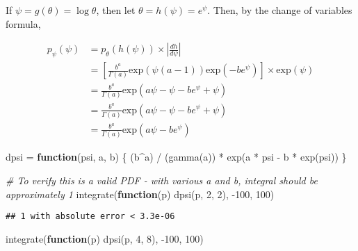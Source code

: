 \documentclass[
]{article}
\newenvironment{Shaded}{\begin{snugshade}}{\end{snugshade}}
\newcommand{\CommentTok}[1]{\textcolor[rgb]{0.56,0.35,0.01}{\textit{#1}}}
\newcommand{\ControlFlowTok}[1]{\textcolor[rgb]{0.13,0.29,0.53}{\textbf{#1}}}
\newcommand{\DecValTok}[1]{\textcolor[rgb]{0.00,0.00,0.81}{#1}}
\newcommand{\FunctionTok}[1]{\textcolor[rgb]{0.00,0.00,0.00}{#1}}
\newcommand{\NormalTok}[1]{#1}
\newcommand{\OtherTok}[1]{\textcolor[rgb]{0.56,0.35,0.01}{#1}}
\newcommand{\SpecialCharTok}[1]{\textcolor[rgb]{0.00,0.00,0.00}{#1}}
\begin{document}
If \(\psi = g(\theta) = \log \theta\), then let
\(\theta = h(\psi) = e^\psi\). Then, by the change of variables formula,

\begin{align}
p_{\psi}(\psi) &= p_{\theta}(h(\psi)) \times \left| \frac{dh}{d\psi} \right| \\
&= \left[ \frac{b^a}{\Gamma(a)} \text{exp}\left(\psi (a - 1)\right) \text{exp}\left( -b e^\psi \right)  \right] \times \text{exp}\left( \psi \right) \\
&= \frac{b^a}{\Gamma(a)} \text{exp}\left(a\psi - \psi - b e^\psi + \psi \right) \\
&= \frac{b^a}{\Gamma(a)} \text{exp}\left(a\psi - \psi - b e^\psi + \psi \right) \\
&= \frac{b^a}{\Gamma(a)} \text{exp}\left(a\psi - b e^\psi \right)
\end{align}

\begin{Shaded}
\begin{Highlighting}[]
\NormalTok{dpsi }\OtherTok{=} \ControlFlowTok{function}\NormalTok{(psi, a, b) \{}
\NormalTok{  (b}\SpecialCharTok{\^{}}\NormalTok{a) }\SpecialCharTok{/}\NormalTok{ (}\FunctionTok{gamma}\NormalTok{(a)) }\SpecialCharTok{*} \FunctionTok{exp}\NormalTok{(a }\SpecialCharTok{*}\NormalTok{ psi }\SpecialCharTok{{-}}\NormalTok{ b }\SpecialCharTok{*} \FunctionTok{exp}\NormalTok{(psi))}
\NormalTok{\}}

\CommentTok{\# To verify this is a valid PDF {-} with various a and b, integral should be approximately 1}
\FunctionTok{integrate}\NormalTok{(}\ControlFlowTok{function}\NormalTok{(p) }\FunctionTok{dpsi}\NormalTok{(p, }\DecValTok{2}\NormalTok{, }\DecValTok{2}\NormalTok{), }\SpecialCharTok{{-}}\DecValTok{100}\NormalTok{, }\DecValTok{100}\NormalTok{)}
\end{Highlighting}
\end{Shaded}

\begin{verbatim}
## 1 with absolute error < 3.3e-06
\end{verbatim}

\begin{Shaded}
\begin{Highlighting}[]
\FunctionTok{integrate}\NormalTok{(}\ControlFlowTok{function}\NormalTok{(p) }\FunctionTok{dpsi}\NormalTok{(p, }\DecValTok{4}\NormalTok{, }\DecValTok{8}\NormalTok{), }\SpecialCharTok{{-}}\DecValTok{100}\NormalTok{, }\DecValTok{100}\NormalTok{)}
\end{Highlighting}
\end{Shaded}
\end{document}
